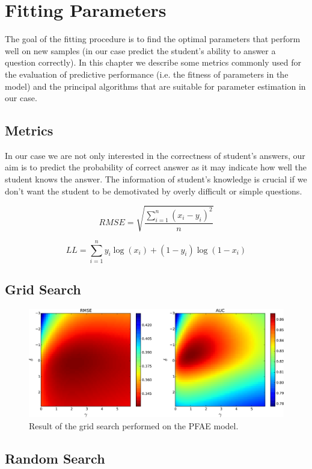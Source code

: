 \section{Fitting Parameters}

The goal of the fitting procedure is to find the optimal parameters that perform well on new samples (in our case predict the student's ability to answer a question correctly). In this chapter we describe some metrics commonly used for the evaluation of predictive performance (i.e. the fitness of parameters in the model) and the principal algorithms that are suitable for parameter estimation in our case.

\subsection{Metrics}

In our case we are not only interested in the correctness of student's answers, our aim is to predict the probability of correct answer as it may indicate how well the student knows the answer. The information of student's knowledge is crucial if we don't want the student to be demotivated by overly difficult or simple questions.

\begin{equation} \label{rmse}
  RMSE = \sqrt{\frac{\sum_{i=1}^n (x_i - y_i)^2}{n}}
\end{equation}

\begin{equation} \label{ll}
  LL = \sum_{i=1}^n y_i \log(x_i) + (1 - y_i) \log(1 - x_i)
\end{equation}

\subsection{Grid Search}

\begin{figure}[htbp]
  \centering
  \includegraphics[width=\textwidth]{img/pfa-grid-search-rmse-auc}
  \caption{Result of the grid search performed on the PFAE model.}
  \label{fig-grid-search-rmse-auc}
\end{figure}

\subsection{Random Search}
